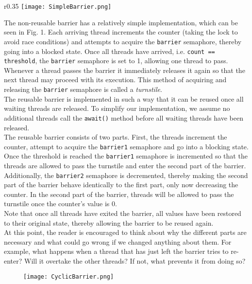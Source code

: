 \documentclass[main]{subfiles}
\begin{document}
\begin{wrapfigure}{r}{0.35\textwidth} %
    \centering
    \vspace{-10pt}
    \texttt{[image: SimpleBarrier.png]}
\end{wrapfigure}
\vspace{0pt}
\noindent The non-reusable barrier has a relatively simple implementation, which can be seen in Fig. 1. Each arriving thread increments the counter (taking the lock to avoid race conditions) and attempts to acquire the \texttt{barrier} semaphore, thereby going into a blocked state. Once all threads have arrived, i.e. \texttt{count == threshold}, the \texttt{barrier} semaphore is set to 1, allowing one thread to pass. Whenever a thread passes the barrier it immediately releases it again so that the next thread may proceed with its execution. This method of acquiring and releasing the \texttt{barrier} semaphore is called a \textit{turnstile}.\\[3mm]


\noindent The reusable barrier is implemented in such a way that it can be reused once all waiting threads are released. To simplify our implementation, we assume no additional threads call the \texttt{await()} method before all waiting threads have been released.\\
The reusable barrier consists of two parts. First, the threads increment the counter, attempt to acquire the \texttt{barrier1} semaphore and go into a blocking state. Once the threshold is reached the \texttt{barrier1} semaphore is incremented so that the threads are allowed to pass the turnstile and enter the second part of the barrier. Additionally, the \texttt{barrier2} semaphore is decremented, thereby making the second part of the barrier behave identically to the first part, only now decreasing the counter. In the second part of the barrier, threads will be allowed to pass the turnstile once the counter's value is 0.\\
Note that once all threads have exited the barrier, all values have been restored to their original state, thereby allowing the barrier to be reused again.\\[3mm]
At this point, the reader is encouraged to think about why the different parts are necessary and what could go wrong if we changed anything about them. For example, what happens when a thread that has just left the barrier tries to re-enter? Will it overtake the other threads? If not, what prevents it from doing so?
\begin{figure}[H]
    \centering
    \texttt{[image: CyclicBarrier.png]}
\end{figure}
\newpage
\end{document}
